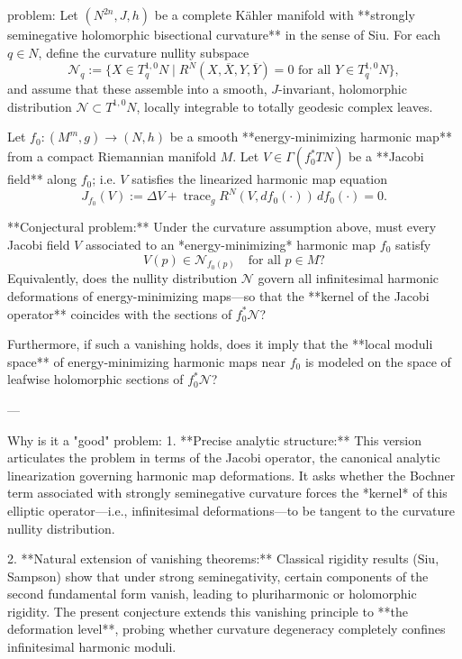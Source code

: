 problem:  
Let \((N^{2n}, J, h)\) be a complete Kähler manifold with **strongly seminegative holomorphic bisectional curvature** in the sense of Siu.  
For each \(q \in N\), define the curvature nullity subspace
\[
\mathcal{N}_q := \{ X \in T^{1,0}_q N \mid R^N(X,\overline{X},Y,\overline{Y}) = 0 \text{ for all } Y \in T^{1,0}_q N \},
\]
and assume that these assemble into a smooth, \(J\)-invariant, holomorphic distribution \(\mathcal{N} \subset T^{1,0}N\), locally integrable to totally geodesic complex leaves.

Let \(f_0:(M^m,g)\to (N,h)\) be a smooth **energy-minimizing harmonic map** from a compact Riemannian manifold \(M\).  
Let \(V \in \Gamma(f_0^*TN)\) be a **Jacobi field** along \(f_0\); i.e. \(V\) satisfies the linearized harmonic map equation
\[
J_{f_0}(V) := \Delta V + \operatorname{trace}_g R^N(V,df_0(\cdot))\,df_0(\cdot) = 0.
\]

**Conjectural problem:**  
Under the curvature assumption above, must every Jacobi field \(V\) associated to an *energy-minimizing* harmonic map \(f_0\) satisfy
\[
V(p) \in \mathcal{N}_{f_0(p)} \quad \text{for all } p \in M?
\]
Equivalently, does the nullity distribution \(\mathcal{N}\) govern all infinitesimal harmonic deformations of energy-minimizing maps—so that the **kernel of the Jacobi operator** coincides with the sections of \(f_0^*\mathcal{N}\)?  

Furthermore, if such a vanishing holds, does it imply that the **local moduli space** of energy-minimizing harmonic maps near \(f_0\) is modeled on the space of leafwise holomorphic sections of \(f_0^*\mathcal{N}\)?

---

Why is it a "good" problem:  
1. **Precise analytic structure:**  
   This version articulates the problem in terms of the Jacobi operator, the canonical analytic linearization governing harmonic map deformations. It asks whether the Bochner term associated with strongly seminegative curvature forces the *kernel* of this elliptic operator—i.e., infinitesimal deformations—to be tangent to the curvature nullity distribution.  

2. **Natural extension of vanishing theorems:**  
   Classical rigidity results (Siu, Sampson) show that under strong seminegativity, certain components of the second fundamental form vanish, leading to pluriharmonic or holomorphic rigidity. The present conjecture extends this vanishing principle to **the deformation level**, probing whether curvature degeneracy completely confines infinitesimal harmonic moduli.  

